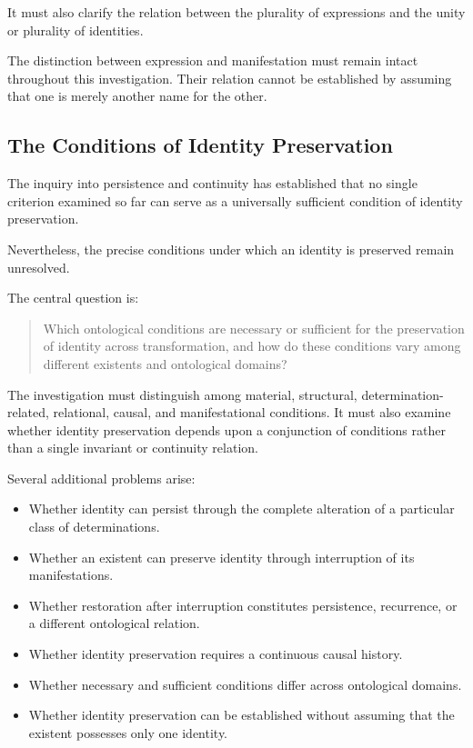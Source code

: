 It must also clarify the relation between the plurality
of expressions and the unity or plurality of identities.

The distinction between expression and manifestation
must remain intact throughout this investigation.
Their relation cannot be established by assuming that
one is merely another name for the other.


\subsection{The Conditions of Identity Preservation}

The inquiry into persistence and continuity has
established that no single criterion examined so far
can serve as a universally sufficient condition of
identity preservation.

Nevertheless, the precise conditions under which an
identity is preserved remain unresolved.

The central question is:

\begin{quote}
Which ontological conditions are necessary or sufficient
for the preservation of identity across transformation,
and how do these conditions vary among different
existents and ontological domains?
\end{quote}

The investigation must distinguish among material,
structural, determination-related, relational, causal,
and manifestational conditions. It must also examine
whether identity preservation depends upon a conjunction
of conditions rather than a single invariant or
continuity relation.

Several additional problems arise:

\begin{itemize}
    \item Whether identity can persist through the
    complete alteration of a particular class of
    determinations.
    \item Whether an existent can preserve identity
    through interruption of its manifestations.
    \item Whether restoration after interruption
    constitutes persistence, recurrence, or a different
    ontological relation.
    \item Whether identity preservation requires a
    continuous causal history.
    \item Whether necessary and sufficient conditions
    differ across ontological domains.
    \item Whether identity preservation can be established
    without assuming that the existent possesses only
    one identity.
\end{itemize}

